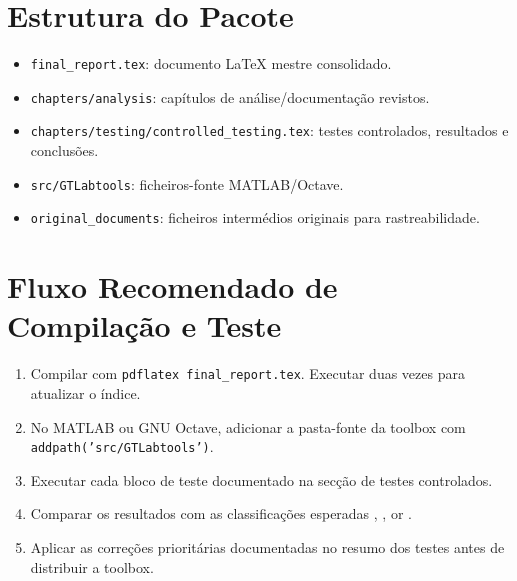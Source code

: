 \documentclass[12pt,a4paper]{report}
\begin{document}
\chapter{Estrutura do Pacote}
\begin{itemize}
\item \texttt{final\_report.tex}: documento LaTeX mestre consolidado.
\item \texttt{chapters/analysis}: capítulos de análise/documentação revistos.
\item \texttt{chapters/testing/controlled\_testing.tex}: testes controlados, resultados e conclusões.
\item \texttt{src/GTLabtools}: ficheiros-fonte MATLAB/Octave.
\item \texttt{original\_documents}: ficheiros intermédios originais para rastreabilidade.
\end{itemize}
\chapter{Fluxo Recomendado de Compilação e Teste}
\begin{enumerate}
\item Compilar com \texttt{pdflatex final\_report.tex}. Executar duas vezes para atualizar o índice.
\item No MATLAB ou GNU Octave, adicionar a pasta-fonte da toolbox com \texttt{addpath('src/GTLabtools')}.
\item Executar cada bloco de teste documentado na secção de testes controlados.
\item Comparar os resultados com as classificações esperadas \APROVADO, \FALHOU, or \NOTA .
\item Aplicar as correções prioritárias documentadas no resumo dos testes antes de distribuir a toolbox.
\end{enumerate}
\end{document}
